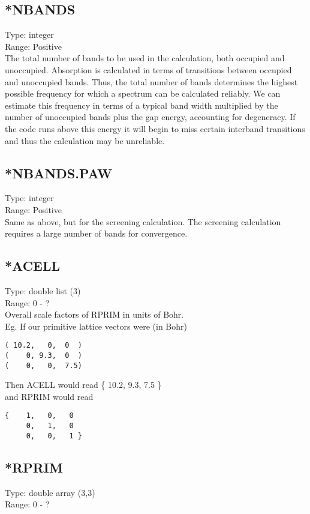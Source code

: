 \documentclass[12pt]{article}
\begin{document}
\subsection{*NBANDS}
Type: integer \\
Range: Positive \\

The total number of bands to be used in the calculation, both occupied and unoccupied.
Absorption is calculated in terms of transitions between occupied and 
unoccupied bands. Thus, the total number of bands determines the highest 
possible frequency for which a spectrum can be calculated reliably. We can
estimate this frequency in terms of a typical band width multiplied by the number of
unoccupied bands plus the gap energy, accounting for degeneracy. If the code runs above this energy it 
will begin to miss certain interband transitions and thus the calculation
may be unreliable.

\subsection{*NBANDS.PAW}
Type: integer \\
Range: Positive \\

Same as above, but for the screening calculation. The screening calculation requires a large number of 
bands for convergence. 

\subsection{*ACELL}
Type: double list (3) \\
Range: 0 - ? \\

Overall scale factors of RPRIM in units of Bohr. \\
Eg. If our primitive lattice vectors were (in Bohr)
\begin{verbatim}
( 10.2,   0,  0  )     
(    0, 9.3,  0  )       
(    0,   0,  7.5) 
\end{verbatim}

Then ACELL would read \{ 10.2, 9.3, 7.5 \} \\
and RPRIM would read
\begin{verbatim}
{    1,   0,   0      
     0,   1,   0        
     0,   0,   1 } 
\end{verbatim}

\subsection{*RPRIM}
Type: double array (3,3)\\
Range: 0 - ? \\
\end{document}
